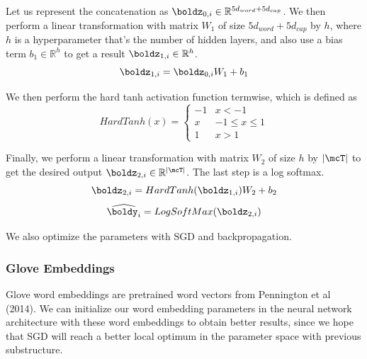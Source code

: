 \documentclass[11pt]{article}
\begin{document}
Let us represent the concatenation as $\boldz_{0, i} \in \mathbb{R}^{5d_{word} + 5d_{cap}}$. We then perform a linear transformation with matrix $W_1$ of size $5d_{word} + 5d_{cap}$ by $h$, where $h$ is a hyperparameter that's the number of hidden layers, and also use a bias term $b_1 \in \mathbb{R}^h$ to get a result $\boldz_{1,i} \in \mathbb{R}^h$.
$$\boldz_{1,i} = \boldz_{0,i}W_1 + b_1$$

We then perform the hard tanh activation function termwise, which is defined as
$$HardTanh(x) = \begin{cases} -1 & x < -1 \\ x & -1 \leq x \leq 1 \\ 1 & x > 1 \end{cases}$$

Finally, we perform a linear transformation with matrix $W_2$ of size $h$ by $|\mcT|$ to get the desired output $\boldz_{2,i} \in \mathbb{R}^{|\mcT|}$. The last step is a log softmax.
$$\boldz_{2,i} = HardTanh(\boldz_{1,i})W_2 + b_2$$
$$\widehat{\boldy_i} = LogSoftMax(\boldz_{2,i})$$

We also optimize the parameters with SGD and backpropagation.

\subsubsection{Glove Embeddings}

Glove word embeddings are pretrained word vectors from Pennington et al (2014). We can initialize our word embedding parameters in the neural network architecture with these word embeddings to obtain better results, since we hope that SGD will reach a better local optimum in the parameter space with previous substructure.
\end{document}
